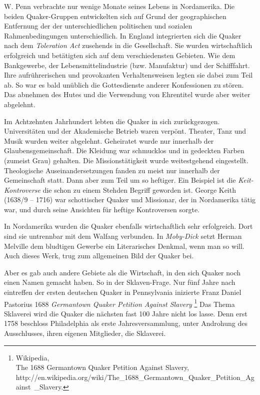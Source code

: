 \medskip

W. Penn verbrachte nur wenige Monate seines Lebens in Nordamerika. Die beiden
Quaker-Gruppen entwickelten sich auf Grund der geographischen Entfernung der der
unterschiedlichen politischen und sozialen Rahmenbedingungen unterschiedlich. In
England integrierten sich die Quaker nach dem \textit{Toleration Act} zusehends
in die Gesellschaft. Sie wurden wirtschaftlich erfolgreich und betätigten sich
auf dem verschiedensten Gebieten. Wie dem Bankgewerbe, der Lebensmittelindustrie
(bzw. Manufaktur) und der Schifffahrt. Ihre aufrührerischen und provokanten
Verhaltensweisen legten sie dabei zum Teil ab. So war es bald unüblich die
Gottesdienste anderer Konfessionen zu stören. Das abnehmen des Hutes und die
Verwendung von Ehrentitel wurde aber weiter abgelehnt.

\medskip

Im Achtzehnten Jahrhundert lebten die Quaker in sich zurückgezogen.
Universitäten und der Akademische Betrieb waren verpönt. Theater, Tanz und Musik
wurden weiter abgelehnt. Geheiratet wurde nur innerhalb der
Glaubensgemeinschaft. Die Kleidung war schmucklos und in gedeckten Farben
(zumeist Grau) gehalten. Die Missionstätigkeit wurde weitestgehend eingestellt.
Theologische Auseinandersetzungen fanden zu meist nur innerhalb der Gemeinschaft
statt. Dann aber zum Teil um so heftiger. Ein Beispiel ist die
\textit{Keit-Kontroverse} die schon zu einem Stehden Begriff geworden ist.
George Keith (1638/9 -- 1716) war schottischer Quaker und Missionar, der in
Nordamerika tätig war, und durch seine Ansichten für heftige Kontroversen
sorgte.

\medskip

In Nordamerika wurden die Quaker ebenfalls wirtschaftlich sehr erfolgreich. Dort
sind sie untrennbar mit dem Walfang verbunden. In \textit{Moby-Dick} setzt
Herman Melville dem bludtigen Gewerbe ein Literarisches Denkmal, wenn man so
will. Auch dieses Werk, trug zum allgemeinen Bild der Quaker bei.

\medskip

Aber es gab auch andere Gebiete als die Wirtschaft, in den sich Quaker noch
einen
Namen gemacht haben. So in der Sklaven-Frage. Nur fünf Jahre nach eintreffen
der ersten deutschen Quaker in Pennsylvania inizierte Franz Daniel Pastorius
1688 \textit{Germantown Quaker Petition Against Slavery}
\footnote{Wikipedia,
\\The 1688 Germantown Quaker Petition Against Slavery,
\\http://en.wikipedia.org/wiki/The\_1688\_Germantown\_Quaker\_Petition\_Against\
\_Slavery.} Das Thema Sklaverei wird die Quaker die nächsten fast 100 Jahre
nicht
los lasse. Denn erst 1758 beschloss Philadelphia als erste Jahresversammlung,
unter Androhung des Ausschlusses, ihren eigenen Mitglieder, die Sklaverei.

